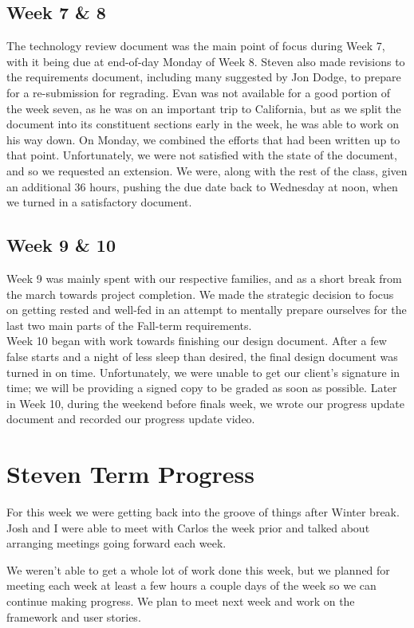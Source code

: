 \documentclass[onecolumn, draftclsnofoot,10pt, compsoc]{IEEEtran}
\begin{document}
\subsection{Week 7 \& 8}
The technology review document was the main point of focus during Week 7, with 
it being due at end-of-day Monday of Week 8. Steven also made revisions to the 
requirements document, including many suggested by Jon Dodge, to prepare for a 
re-submission for regrading. Evan was not available for a good portion of the 
week seven, as he was on an important trip to California, but as we split the 
document into its constituent sections early in the week, he was able to work 
on his way down. On Monday, we combined the efforts that had been written up 
to that point. Unfortunately, we were not satisfied with the state of the 
document, and so we requested an extension. We were, along with the rest of 
the class, given an additional 36 hours, pushing the due date back to Wednesday 
at noon, when we turned in a satisfactory document.


\subsection{Week 9 \& 10}
Week 9 was mainly spent with our respective families, and as a short break from 
the march towards project completion. We made the strategic decision to focus 
on getting rested and well-fed in an attempt to mentally prepare ourselves for 
the last two main parts of the Fall-term requirements. \\
 
\noindent Week 10 began with work towards finishing our design document. 
After a few false starts and a night of less sleep than desired, the final 
design document was turned in on time. Unfortunately, we were unable to get 
our client's signature in time; we will be providing a signed copy to be graded 
as soon as possible. Later in Week 10, during the weekend before finals week, 
we wrote our progress update document and recorded our progress update video.


\section{Steven Term Progress}
For this week we were getting back into the groove of things after Winter break. 
Josh and I were able to meet with Carlos the week prior and talked about 
arranging meetings going forward each week.

We weren't able to get a whole lot of work done this week, but we planned for 
meeting each week at least a few hours a couple days of the week so we can 
continue making progress. We plan to meet next week and work on the framework 
and user stories.
\end{document}
